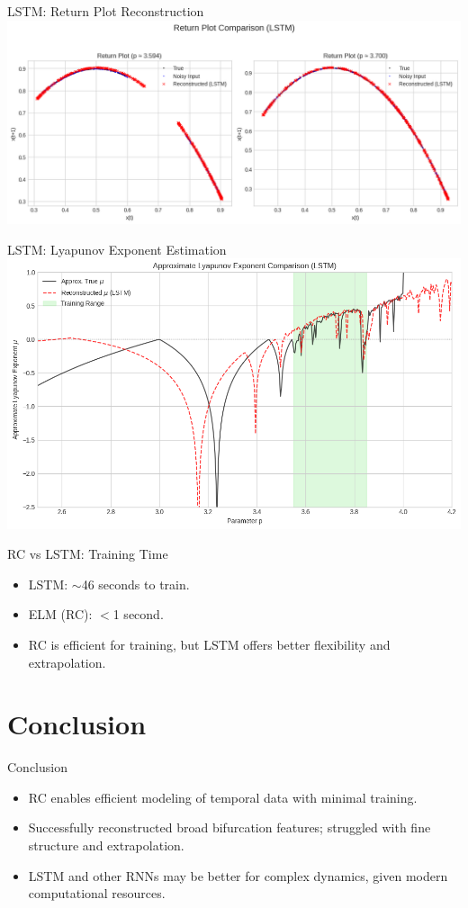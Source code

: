 \documentclass{beamer}
\begin{document}
\begin{frame}{LSTM: Return Plot Reconstruction}
  \includegraphics[width=1.0\linewidth]{figures/lstm_bd_2.png}
\end{frame}

\begin{frame}{LSTM: Lyapunov Exponent Estimation}
  \includegraphics[width=1.0\linewidth]{figures/lstm_bd_3.png}
\end{frame}

\begin{frame}{RC vs LSTM: Training Time}
  \begin{itemize}
    \item LSTM: $\sim$46 seconds to train.
    \item ELM (RC): $<$1 second.
    \item RC is efficient for training, but LSTM offers better flexibility and extrapolation.
  \end{itemize}
\end{frame}

\section{Conclusion}
\begin{frame}{Conclusion}
  \begin{itemize}
    \item RC enables efficient modeling of temporal data with minimal training.
    \item Successfully reconstructed broad bifurcation features; struggled with fine structure and extrapolation.
    \item LSTM and other RNNs may be better for complex dynamics, given modern computational resources.
  \end{itemize}
\end{frame}
\end{document}
